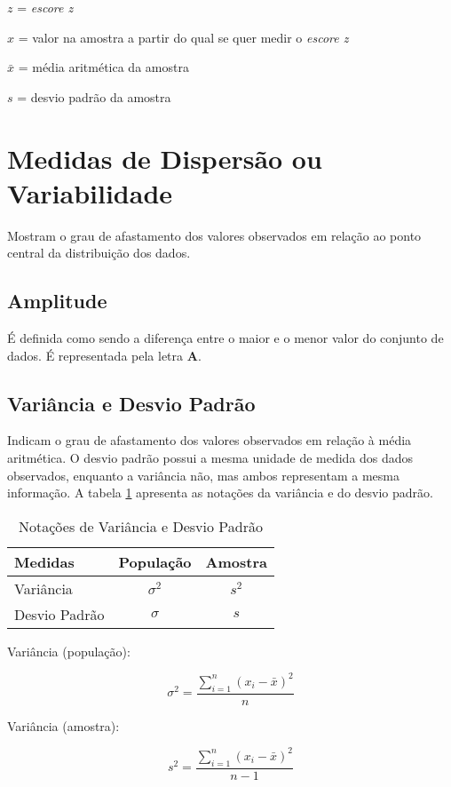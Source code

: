 \(z\) = \emph{escore z}

\(x\) = valor na amostra a partir do qual se quer medir o \emph{escore z}

\(\bar{x}\) = média aritmética da amostra

\(s\) = desvio padrão da amostra

\section{Medidas de Dispersão ou Variabilidade}

Mostram o grau de afastamento dos valores observados em relação ao ponto central da distribuição dos dados.

\subsection{Amplitude}

É definida como sendo a diferença entre o maior e o menor valor
do conjunto de dados. É representada pela letra \textbf{A}.

\subsection{Variância e Desvio Padrão}

Indicam o grau de afastamento dos valores observados em relação à média aritmética. O desvio padrão possui a mesma unidade de medida dos dados observados, enquanto a variância não, mas ambos representam a mesma informação. A tabela \ref{tab:notacoes-var-dp} apresenta as notações da variância e do desvio padrão.

\begin{table}[h]
	\centering	
	\caption{Notações de Variância e Desvio Padrão}
	\label{tab:notacoes-var-dp}
	\begin{tabular}{l|cc} 
		Medidas 		& População 	& Amostra 		\\
		\hline
		Variância		& \(\sigma^2 \)	& \(s^2\)	\\
		Desvio Padrão	& \(\sigma \)	& \(s\)
	\end{tabular}
\end{table}

Variância (população):

\[ \sigma^2=\frac{\sum_{i=1}^{n} (x_i - \bar{x})^2}{n} \]

Variância (amostra):

\[ s^2=\frac{\sum_{i=1}^{n} (x_i - \bar{x})^2}{n-1} \]

